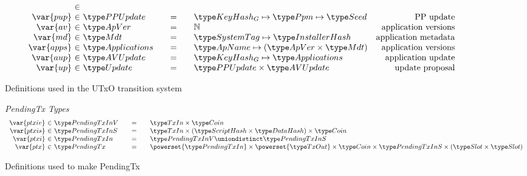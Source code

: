 \begin{figure*}[htb]
\begin{equation*}
\begin{array}{r@{~\in~}l@{\qquad=\qquad}lr}
      \\
      \var{pup}
      & \PPUpdate
      & \KeyHashGen \mapsto \Ppm \mapsto \Seed
      & \text{PP update}
      \\
      \var{av}
      & \ApVer
      & \N
      & \text{application versions}
      \\
      \var{md}
      & \Metadata
      & \SystemTag\mapsto\InstallerHash
      & \text{application metadata}
      \\
      \var{apps}
      & \Applications
      & \ApName \mapsto (\ApVer \times \Metadata)
      & \text{application versions}
      \\
      \var{aup}
      & \AVUpdate
      & \KeyHashGen \mapsto \Applications
      & \text{application update}
      \\
      \var{up}
      & \Update
      & \PPUpdate \times \AVUpdate
      & \text{update proposal}
    \end{array}
  \end{equation*}
  \caption{Definitions used in the UTxO transition system}
  \label{fig:defs:utxo-shelley-1}
\end{figure*}

\begin{figure*}[htb]
  \emph{PendingTx Types}
  \begin{equation*}
    \begin{array}{r@{~\in~}l@{\qquad=\qquad}l}
      \var{ptxiv}
      & \PendingTxInV
      & \TxIn \times \Coin
      \\
      \var{ptxis}
      & \PendingTxInS
      & \TxIn \times (\HashScr \times \HashDat) \times \Coin
      \\
      \var{ptxi}
      & \PendingTxIn
      & \PendingTxInV \uniondistinct \PendingTxInS
      \\
      \var{ptx}
      & \PendingTx
      & \powerset{\PendingTxIn} \times  \powerset{\TxOut} \times \Coin \times
      \PendingTxInS \times (\Slot\times\Slot)
      \\
    \end{array}
  \end{equation*}
  \caption{Definitions used to make PendingTx}
  \label{fig:defs:utxo-pending}
\end{figure*}

